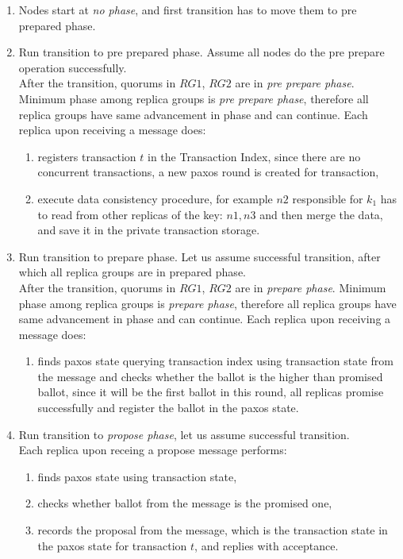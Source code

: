 \begin{enumerate}
\item Nodes start at \emph{no phase}, and first transition has to move them to pre prepared phase.

\item Run transition to pre prepared phase. Assume all nodes do the pre prepare operation successfully. \\
 After the transition, quorums in $RG1$, $RG2$ are in \emph{pre prepare phase}. Minimum phase among replica groups is \emph{pre prepare phase}, therefore all replica groups have same advancement in phase and can continue. Each replica upon receiving a message does:
 \begin{enumerate}
 	\item registers transaction $t$ in the Transaction Index, since there are no concurrent transactions, a new paxos round is created for transaction,
 	\item execute data consistency procedure, for example $n2$ responsible for $k_{1}$ has to read from other replicas of the key: $n1, n3$ and then merge the data, and save it in the private transaction storage.
 \end{enumerate}

\item Run transition to prepare phase. Let us assume successful transition, after which all replica groups are in prepared phase. \\
  After the transition, quorums in $RG1$, $RG2$ are in \emph{prepare phase}. Minimum phase among replica groups is \emph{prepare phase}, therefore all replica groups have same advancement in phase and can continue. Each replica upon receiving a message does:

  \begin{enumerate}
  	\item finds paxos state querying transaction index using transaction state from the message and checks whether the ballot is the higher than promised ballot, since it will be the first ballot in this round, all replicas promise successfully and register the ballot in the paxos state.
  \end{enumerate}

\item Run transition to \emph{propose phase}, let us assume successful transition. \\
	Each replica upon receing a propose message performs:

	\begin{enumerate}
		\item finds paxos state using transaction state,
		\item checks whether ballot from the message is the promised one,
		\item records the proposal from the message, which is the transaction state in the paxos state for transaction $t$, and replies with acceptance.
	\end{enumerate}


\end{enumerate}
